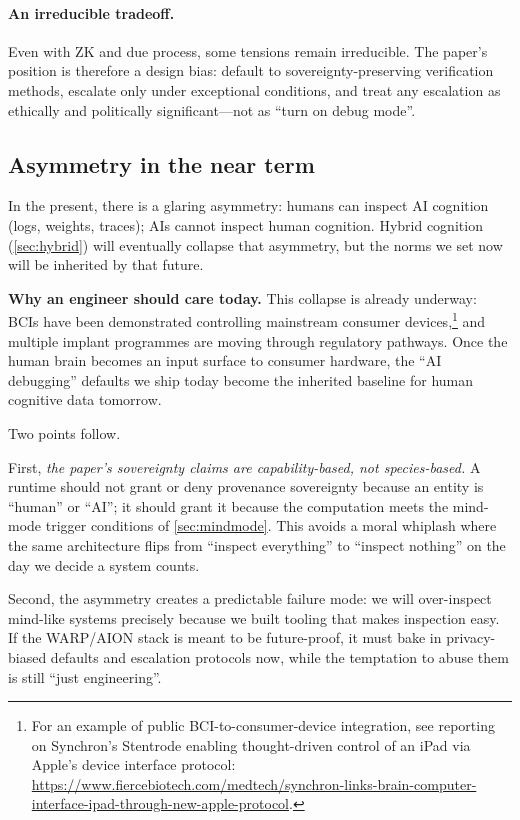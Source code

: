 \documentclass{aion}
\begin{document}
\paragraph{An irreducible tradeoff.}
Even with ZK and due process, some tensions remain irreducible.
The paper's position is therefore a design bias:
default to sovereignty-preserving verification methods, escalate only under
exceptional conditions, and treat any escalation as ethically and politically
significant---not as ``turn on debug mode''.

\subsection{Asymmetry in the near term}
\label{sec:asymmetry}

In the present, there is a glaring asymmetry:
humans can inspect AI cognition (logs, weights, traces); AIs cannot inspect
human cognition.
Hybrid cognition (\cref{sec:hybrid}) will eventually collapse that asymmetry, but
the norms we set now will be inherited by that future.

\noindent\textbf{Why an engineer should care today.}
This collapse is already underway: BCIs have been demonstrated controlling mainstream consumer
devices,\footnote{For an example of public BCI-to-consumer-device integration, see reporting on Synchron's Stentrode enabling thought-driven control of an iPad via Apple's device interface protocol: \url{https://www.fiercebiotech.com/medtech/synchron-links-brain-computer-interface-ipad-through-new-apple-protocol}.} and multiple implant programmes are moving through regulatory pathways.
Once the human brain becomes an input surface to consumer hardware, the ``AI debugging'' defaults we
ship today become the inherited baseline for human cognitive data tomorrow.


Two points follow.

First, \emph{the paper's sovereignty claims are capability-based, not species-based.}
A runtime should not grant or deny provenance sovereignty because an entity is
``human'' or ``AI''; it should grant it because the computation meets the
mind-mode trigger conditions of \cref{sec:mindmode}.
This avoids a moral whiplash where the same architecture flips from ``inspect
everything'' to ``inspect nothing'' on the day we decide a system counts.

Second, the asymmetry creates a predictable failure mode:
we will over-inspect mind-like systems precisely because we built tooling that
makes inspection easy.
If the WARP/AION stack is meant to be future-proof, it must bake in
privacy-biased defaults and escalation protocols now, while the temptation to
abuse them is still ``just engineering''.
\end{document}
